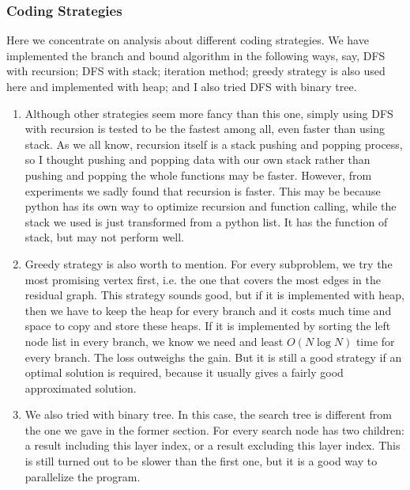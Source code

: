 \subsubsection{Coding Strategies}
Here we concentrate on analysis about different coding strategies. We have implemented the branch and bound algorithm in the following ways, say, DFS with recursion; DFS with stack; iteration method; greedy strategy is also used here and implemented with heap; and I also tried DFS with binary tree.
\begin{enumerate}
\item Although other strategies seem more fancy than this one, simply using DFS with recursion is tested to be the fastest among all, even faster than using stack. As we all know, recursion itself is a stack pushing and popping process, so I thought pushing and popping data with our own stack rather than pushing and popping the whole functions may be faster. However, from experiments we sadly found that recursion is faster. This may be because python has its own way to optimize recursion and function calling, while the stack we used is just transformed from a python list. It has the function of stack, but may not perform well.
\item Greedy strategy is also worth to mention. For every subproblem, we try the most promising vertex first, i.e. the one that covers the most edges in the residual graph. This strategy sounds good, but if it is implemented with heap, then we have to keep the heap for every branch and it costs much time and space to copy and store these heaps. If it is implemented by sorting the left node list in every branch, we know we need and least $O\left( N\log N \right)$ time for every branch. The loss outweighs the gain. But it is still a good strategy if an optimal solution is required, because it usually gives a fairly good approximated solution.
\item We also tried with binary tree. In this case, the search tree is different from the one we gave in the former section. For every search node has two children: a result including this layer index, or a result excluding this layer index. This is still turned out to be slower than the first one, but it is a good way to parallelize the program.
\end{enumerate}


